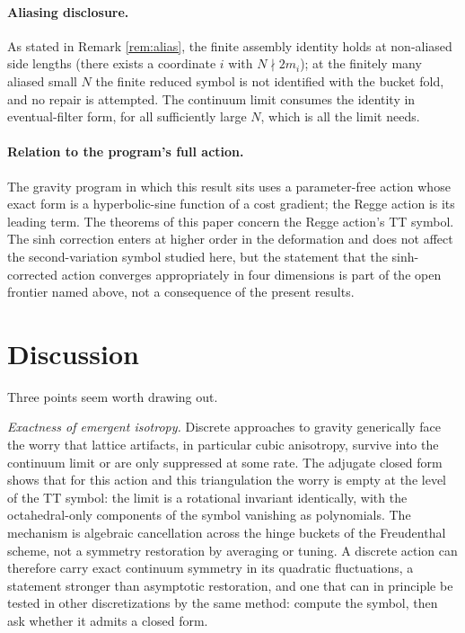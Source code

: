 \documentclass[11pt]{article}
\theoremstyle{definition}
\theoremstyle{remark}
\begin{document}
\paragraph{Aliasing disclosure.}
As stated in Remark \ref{rem:alias}, the finite assembly identity holds at non-aliased side lengths (there exists a coordinate $i$ with $N\nmid 2m_i$); at the finitely many aliased small $N$ the finite reduced symbol is not identified with the bucket fold, and no repair is attempted. The continuum limit consumes the identity in eventual-filter form, for all sufficiently large $N$, which is all the limit needs.

\paragraph{Relation to the program's full action.}
The gravity program in which this result sits uses a parameter-free action whose exact form is a hyperbolic-sine function of a cost gradient; the Regge action is its leading term. The theorems of this paper concern the Regge action's TT symbol. The sinh correction enters at higher order in the deformation and does not affect the second-variation symbol studied here, but the statement that the sinh-corrected action converges appropriately in four dimensions is part of the open frontier named above, not a consequence of the present results.

\section{Discussion}
\label{sec:discussion}

Three points seem worth drawing out.

\emph{Exactness of emergent isotropy.} Discrete approaches to gravity generically face the worry that lattice artifacts, in particular cubic anisotropy, survive into the continuum limit or are only suppressed at some rate. The adjugate closed form shows that for this action and this triangulation the worry is empty at the level of the TT symbol: the limit is a rotational invariant identically, with the octahedral-only components of the symbol vanishing as polynomials. The mechanism is algebraic cancellation across the hinge buckets of the Freudenthal scheme, not a symmetry restoration by averaging or tuning. A discrete action can therefore carry exact continuum symmetry in its quadratic fluctuations, a statement stronger than asymptotic restoration, and one that can in principle be tested in other discretizations by the same method: compute the symbol, then ask whether it admits a closed form.
\end{document}
